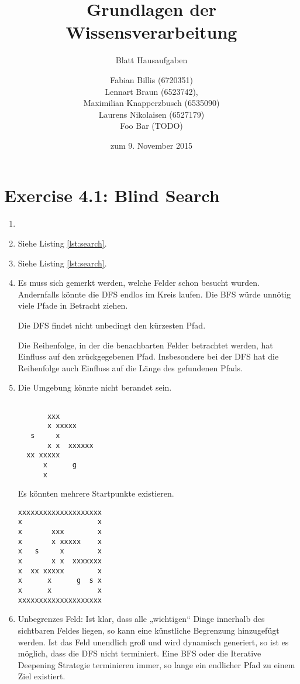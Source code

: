\documentclass[a4paper]{scrartcl}
\title{Grundlagen der Wissensverarbeitung}
\subtitle{Blatt {\blattnr} Hausaufgaben}
\author{
    Fabian Billis (6720351) \\
    Lennart Braun (6523742), \\
    Maximilian Knapperzbusch (6535090) \\
    Laurens Nikolaisen (6527179) \\
    Foo Bar (TODO)
}
\date{zum 9. November 2015}
\def \blattnr {4}
\begin{document}
\maketitle

\section*{Exercise \blattnr.1: Blind Search}
\begin{enumerate}
    \item

    \item
        Siehe Listing \ref{lst:search}.

    \item
        Siehe Listing \ref{lst:search}.

    \item
        Es muss sich gemerkt werden, welche Felder schon besucht wurden.
        Andernfalls könnte die DFS endlos im Kreis laufen. Die BFS würde
        unnötig viele Pfade in Betracht ziehen.

        Die DFS findet nicht unbedingt den kürzesten Pfad.

        Die Reihenfolge, in der die benachbarten Felder betrachtet werden, hat
        Einfluss auf den zrückgegebenen Pfad. Insbesondere bei der DFS hat
        die Reihenfolge auch Einfluss auf die Länge des gefundenen Pfads.

        \clearpage
    \item
        Die Umgebung könnte nicht berandet sein.
        \begin{verbatim}
                  
       xxx        
       x xxxxx    
   s     x        
       x x  xxxxxx
  xx xxxxx        
      x      g    
      x           
        \end{verbatim}
        Es könnten mehrere Startpunkte existieren.
        \begin{verbatim}
xxxxxxxxxxxxxxxxxxxx
x                  x
x       xxx        x
x       x xxxxx    x
x   s     x        x
x       x x  xxxxxxx
x  xx xxxxx        x
x      x      g  s x
x      x           x
xxxxxxxxxxxxxxxxxxxx
        \end{verbatim}

    \item
        Unbegrenzes Feld:
        Ist klar, dass alle „wichtigen“ Dinge innerhalb des sichtbaren Feldes
        liegen, so kann eine künstliche Begrenzung hinzugefügt werden.  Ist das
        Feld unendlich groß und wird dynamisch generiert, so ist es möglich,
        dass die DFS nicht terminiert.  Eine BFS oder die Iterative Deepening
        Strategie terminieren immer, so lange ein endlicher Pfad zu einem Ziel
        existiert.


\end{enumerate}
\end{document}
